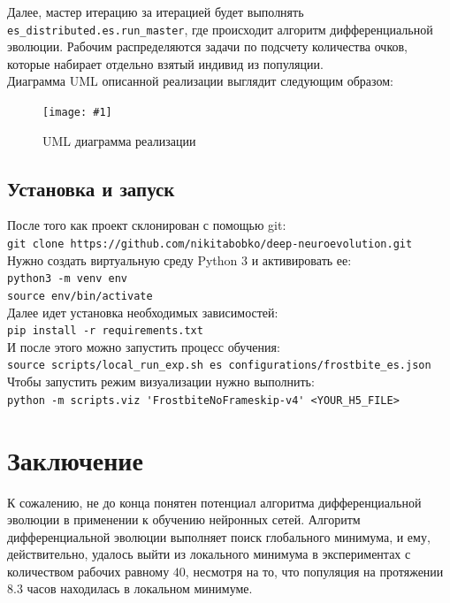 \documentclass[12pt]{article}
\newcommand{\img}[3]{
    \begin{figure}[H]
        \centering
        \texttt{[image: \#1]}
        \caption{#3}
    \end{figure}
}
\begin{document}
    Далее, мастер итерацию за итерацией будет выполнять \verb!es_distributed.es.run_master!, где происходит алгоритм дифференциальной эволюции. Рабочим распределяются задачи по подсчету количества очков, которые набирает отдельно взятый индивид из популяции. \\

    Диаграмма UML описанной реализации выглядит следующим образом:
    \img{uml.png}{0.8}{UML диаграмма реализации}

    \subsection{Установка и запуск}
    После того как проект склонирован с помощью git: \\

    \verb!git clone https://github.com/nikitabobko/deep-neuroevolution.git! \\

    Нужно создать виртуальную среду Python 3 и активировать ее: \\

    \verb!python3 -m venv env! \\
    \verb!source env/bin/activate! \\

    Далее идет установка необходимых зависимостей: \\

    \verb!pip install -r requirements.txt! \\

    И после этого можно запустить процесс обучения: \\

    \verb!source scripts/local_run_exp.sh es configurations/frostbite_es.json! \\

    Чтобы запустить режим визуализации нужно выполнить: \\

    \verb!python -m scripts.viz 'FrostbiteNoFrameskip-v4' <YOUR_H5_FILE>!

\section{Заключение}
    К сожалению, не до конца понятен потенциал алгоритма дифференциальной эволюции в применении к обучению нейронных сетей. Алгоритм дифференциальной эволюции выполняет поиск глобального минимума, и ему, действительно, удалось выйти из локального минимума в экспериментах с количеством рабочих равному $40$, несмотря на то, что популяция на протяжении $8.3$ часов находилась в локальном минимуме. \\
\end{document}
